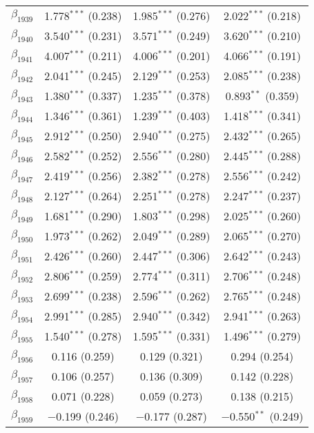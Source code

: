 \begin{table}[!h]
\begin{tabular}{@{\extracolsep{5pt}}lccc}
  $\beta_{1939}$ & 1.778$^{***}$ (0.238) & 1.985$^{***}$ (0.276) & 2.022$^{***}$ (0.218) \\ 
  $\beta_{1940}$ & 3.540$^{***}$ (0.231) & 3.571$^{***}$ (0.249) & 3.620$^{***}$ (0.210) \\ 
  $\beta_{1941}$ & 4.007$^{***}$ (0.211) & 4.006$^{***}$ (0.201) & 4.066$^{***}$ (0.191) \\ 
  $\beta_{1942}$ & 2.041$^{***}$ (0.245) & 2.129$^{***}$ (0.253) & 2.085$^{***}$ (0.238) \\ 
  $\beta_{1943}$ & 1.380$^{***}$ (0.337) & 1.235$^{***}$ (0.378) & 0.893$^{**}$ (0.359) \\ 
  $\beta_{1944}$ & 1.346$^{***}$ (0.361) & 1.239$^{***}$ (0.403) & 1.418$^{***}$ (0.341) \\ 
  $\beta_{1945}$ & 2.912$^{***}$ (0.250) & 2.940$^{***}$ (0.275) & 2.432$^{***}$ (0.265) \\ 
  $\beta_{1946}$ & 2.582$^{***}$ (0.252) & 2.556$^{***}$ (0.280) & 2.445$^{***}$ (0.288) \\ 
  $\beta_{1947}$ & 2.419$^{***}$ (0.256) & 2.382$^{***}$ (0.278) & 2.556$^{***}$ (0.242) \\ 
  $\beta_{1948}$ & 2.127$^{***}$ (0.264) & 2.251$^{***}$ (0.278) & 2.247$^{***}$ (0.237) \\ 
  $\beta_{1949}$ & 1.681$^{***}$ (0.290) & 1.803$^{***}$ (0.298) & 2.025$^{***}$ (0.260) \\ 
  $\beta_{1950}$ & 1.973$^{***}$ (0.262) & 2.049$^{***}$ (0.289) & 2.065$^{***}$ (0.270) \\ 
  $\beta_{1951}$ & 2.426$^{***}$ (0.260) & 2.447$^{***}$ (0.306) & 2.642$^{***}$ (0.243) \\ 
  $\beta_{1952}$ & 2.806$^{***}$ (0.259) & 2.774$^{***}$ (0.311) & 2.706$^{***}$ (0.248) \\ 
  $\beta_{1953}$ & 2.699$^{***}$ (0.238) & 2.596$^{***}$ (0.262) & 2.765$^{***}$ (0.248) \\ 
  $\beta_{1954}$ & 2.991$^{***}$ (0.285) & 2.940$^{***}$ (0.342) & 2.941$^{***}$ (0.263) \\ 
  $\beta_{1955}$ & 1.540$^{***}$ (0.278) & 1.595$^{***}$ (0.331) & 1.496$^{***}$ (0.279) \\ 
  $\beta_{1956}$ & 0.116 (0.259) & 0.129 (0.321) & 0.294 (0.254) \\ 
  $\beta_{1957}$ & 0.106 (0.257) & 0.136 (0.309) & 0.142 (0.228) \\ 
  $\beta_{1958}$ & 0.071 (0.228) & 0.059 (0.273) & 0.138 (0.215) \\ 
  $\beta_{1959}$ & $-$0.199 (0.246) & $-$0.177 (0.287) & $-$0.550$^{**}$ (0.249) \\ 

\end{tabular}
\end{table}
